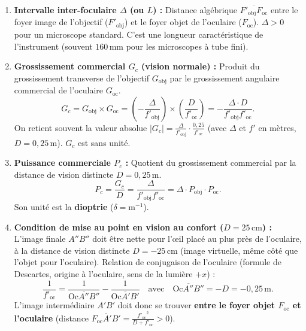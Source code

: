 \documentclass[11pt]{article}
\begin{document}
\begin{corrige}
\begin{enumerate}
    \item \textbf{Intervalle inter-foculaire $\Delta$ (ou $L$) :} Distance algébrique $\overline{F'_{\text{obj}}F_{\text{oc}}}$ entre le foyer image de l'objectif ($F'_{\text{obj}}$) et le foyer objet de l'oculaire ($F_{\text{oc}}$). $\Delta > 0$ pour un microscope standard. C'est une longueur caractéristique de l'instrument (souvent $160\,\text{mm}$ pour les microscopes à tube fini).
    \item \textbf{Grossissement commercial $G_c$ (vision normale) :} Produit du grossissement transverse de l'objectif $G_{\text{obj}}$ par le grossissement angulaire commercial de l'oculaire $G_{\text{oc}}$.
    \[
    G_c = G_{\text{obj}} \times G_{\text{oc}} = \left(-\frac{\Delta}{f'_{\text{obj}}}\right) \times \left(\frac{D}{f'_{\text{oc}}}\right) = -\frac{\Delta \cdot D}{f'_{\text{obj}} f'_{\text{oc}}}.
    \]
    On retient souvent la valeur absolue $|G_c| = \frac{\Delta}{f'_{\text{obj}}} \cdot \frac{0,25}{f'_{\text{oc}}}$ (avec $\Delta$ et $f'$ en mètres, $D=0,25\,\text{m}$). $G_c$ est sans unité.
    \item \textbf{Puissance commerciale $P_c$ :} Quotient du grossissement commercial par la distance de vision distincte $D = 0,25\,\text{m}$.
    \[
    P_c = \frac{G_c}{D} = \frac{\Delta}{f'_{\text{obj}} f'_{\text{oc}}} = \Delta \cdot P_{\text{obj}} \cdot P_{\text{oc}}.
    \]
    Son unité est la \textbf{dioptrie} ($\delta = \text{m}^{-1}$).
    \item \textbf{Condition de mise au point en vision au confort ($D = 25\,\text{cm}$) :} L'image finale $A''B''$ doit être nette pour l'œil placé au plus près de l'oculaire, à la distance de vision distincte $D = -25\,\text{cm}$ (image virtuelle, même côté que l'objet pour l'oculaire).
    Relation de conjugaison de l'oculaire (formule de Descartes, origine à l'oculaire, sens de la lumière $+x$) :
    \[
    \frac{1}{f'_{\text{oc}}} = \frac{1}{\overline{\text{Oc}A''B''}} - \frac{1}{\overline{\text{Oc}A'B'}} \quad \text{avec} \quad \overline{\text{Oc}A''B''} = -D = -0,25\,\text{m}.
    \]
    L'image intermédiaire $A'B'$ doit donc se trouver \textbf{entre le foyer objet $F_{\text{oc}}$ et l'oculaire} (distance $\overline{F_{\text{oc}}A'B'} = \frac{{f'_{\text{oc}}}^2}{D+f'_{\text{oc}}} > 0$).
\end{enumerate}
\end{corrige}
\end{document}
